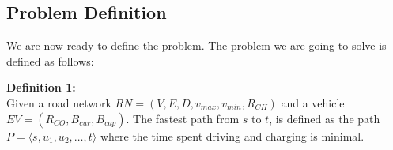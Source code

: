 \subsection{Problem Definition} %
\label{sub:problem_definition}
We are now ready to define the problem. The problem we are going to solve is defined as follows:

\textbf{Definition 1:}\\
Given a road network \(RN=(V,E,D,v_{max},v_{min},R_{CH})\) and a vehicle $EV=(R_{CO},B_{cur},B_{cap})$. The fastest path from $s$ to $t$, is defined as the path $P = \langle s,u_1,u_2,\dots,t \rangle$ where the time spent driving and charging is minimal.
